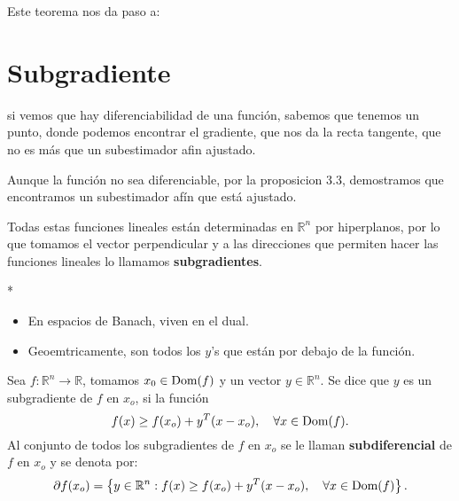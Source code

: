 \begin{paracol}{2}
Este teorema nos da paso a:

\section{Subgradiente}
si vemos que hay diferenciabilidad de una función, sabemos que tenemos un punto, donde podemos encontrar el gradiente, que nos da la recta tangente, que no es más que un subestimador afin ajustado. 
\begin{center}
\end{center}
Aunque la función no sea diferenciable, por la proposicion 3.3, demostramos que encontramos un subestimador afín que está ajustado.
\begin{center}
\end{center}
Todas estas funciones lineales están determinadas en $\mathbb{R}^n$ por hiperplanos, por lo que tomamos el vector perpendicular y a las direcciones que permiten hacer las funciones lineales lo llamamos \textbf{subgradientes}.

\switchcolumn[1]*{\noindent\scriptsize
    \begin{itemize}
	\item En espacios de Banach, viven en el dual.
	\item Geoemtricamente, son todos los $y$'s que están por debajo de la función.
    \end{itemize}
}
\switchcolumn[0]\noindent
\begin{def.} Sea $f:\mathbb{R}^n\to \mathbb{R}$, tomamos $x_0\in \mathop{\mbox{\normalfont Dom}}\nolimits(f)$ y un vector $y\in \mathbb{R}^n$. Se dice que $y$ es un subgradiente de $f$ en $x_o$, si la función 
    $$f(x)\geq f(x_o)+y^T(x-x_o), \quad \forall x\in \mathop{\mbox{\normalfont Dom}}\nolimits(f).$$
    Al conjunto de todos los subgradientes de $f$ en $x_o$ se le llaman \textbf{subdiferencial} de $f$ en $x_o$ y se denota por:
    $$\partial f(x_o)=\left\{y\in \mathbb{R}^n: f(x)\geq f(x_o)+y^T(x-x_o), \quad \forall x\in \mathop{\mbox{\normalfont Dom}}\nolimits(f)\right\}.$$
\end{def.}


\end{paracol}
